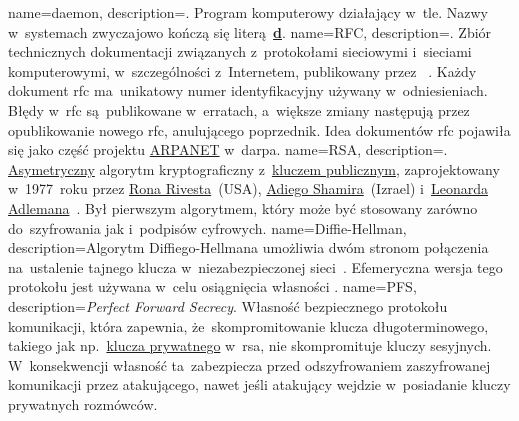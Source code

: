 {
	name={daemon},
	description={. Program komputerowy działający w~tle. Nazwy  w~systemach  zwyczajowo kończą się literą~\href{https://unix.stackexchange.com/questions/72587/why-do-some-linux-files-have-a-d-suffix}{\textbf{d}}.}
}
{
	name={RFC},
	description={. Zbiór technicznych dokumentacji związanych z~protokołami sieciowymi i~sieciami komputerowymi, w~szczególności z~Internetem, publikowany przez ~\cite{rfc-editor}. Każdy dokument \gls{rfc} ma~unikatowy numer identyfikacyjny używany w~odniesieniach. Błędy w~\gls{rfc} są~publikowane w~erratach, a~większe zmiany następują przez opublikowanie nowego \gls{rfc}, anulującego poprzednik. Idea dokumentów \gls{rfc} pojawiła się jako część projektu \href{https://en.wikipedia.org/wiki/ARPANET}{ARPANET} w~\gls{darpa}.}
}
{
	name={RSA},
	description={. \href{https://en.wikipedia.org/wiki/Public-key_cryptography}{Asymetryczny} algorytm kryptograficzny z~\href{https://en.wikipedia.org/wiki/Public-key_cryptography}{kluczem publicznym}, zaprojektowany w~1977~roku przez \href{https://en.wikipedia.org/wiki/Ron_Rivest}{Rona Rivesta}~(USA), \href{https://en.wikipedia.org/wiki/Adi_Shamir}{Adiego Shamira}~(Izrael) i~\href{https://en.wikipedia.org/wiki/Leonard_Adleman}{Leonarda Adlemana}~\cite{rsa}. Był pierwszym algorytmem, który może być stosowany zarówno do~szyfrowania jak i~podpisów cyfrowych.}
}
{
	name={Diffie-Hellman},
	description={Algorytm Diffiego-Hellmana umożliwia dwóm stronom połączenia na~ustalenie tajnego klucza w~niezabezpieczonej sieci~\cite{mimuw-ssl-w04}. Efemeryczna wersja tego protokołu jest używana w~celu osiągnięcia własności .}
}
{
	name={PFS},
	description={\emph{Perfect Forward Secrecy}. Własność bezpiecznego protokołu komunikacji, która zapewnia, że~skompromitowanie klucza długoterminowego, takiego jak np.~\href{https://en.wikipedia.org/wiki/Public-key_cryptography}{klucza prywatnego} w~\gls{rsa}, nie skompromituje kluczy sesyjnych. W~konsekwencji własność ta~zabezpiecza przed odszyfrowaniem zaszyfrowanej komunikacji przez atakującego, nawet jeśli atakujący wejdzie w~posiadanie kluczy prywatnych rozmówców.}
}
